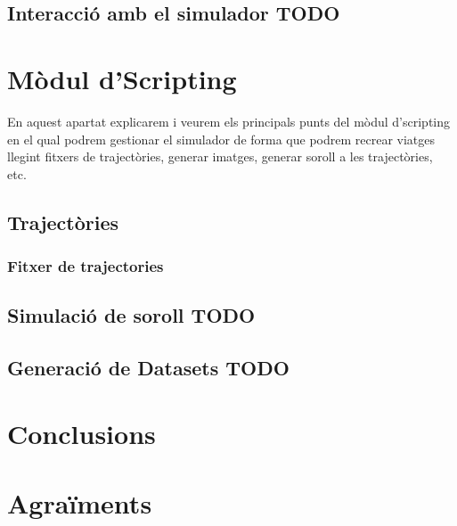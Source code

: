 \documentclass[10pt,a4paper,twocolumn,twoside]{article}
\begin{document}
\subsection{Interacció amb el simulador TODO}

\section{Mòdul d'Scripting}
En aquest apartat explicarem i veurem els principals punts del mòdul d'scripting en el qual podrem gestionar el simulador de forma que podrem recrear viatges llegint fitxers de trajectòries, generar imatges, generar soroll a les trajectòries, etc.

\subsection{Trajectòries}


\subsubsection{Fitxer de trajectories}

\subsection{Simulació de soroll TODO}

\subsection{Generació de Datasets TODO}

\section{Conclusions}


\section*{Agraïments}
\end{document}
